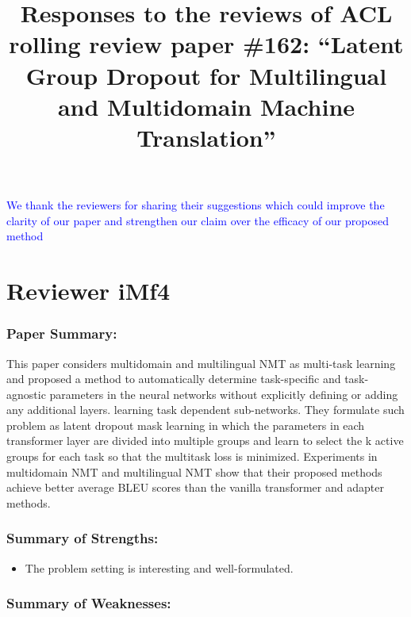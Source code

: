\documentclass[12pt,times,a4paper,twoside]{article}
\title{Responses to the reviews of ACL rolling review paper \#162:
  ``Latent Group Dropout for Multilingual and Multidomain Machine Translation''
}
\date{}
\theoremstyle{definition}
\begin{document}
\maketitle

\textcolor{blue}{We thank the reviewers for sharing their suggestions which could improve the clarity of our paper and strengthen our claim over the efficacy of our proposed method}

\section*{Reviewer iMf4}
\subsubsection*{Paper Summary:}

This paper considers multidomain and multilingual NMT as multi-task learning and proposed a method to automatically determine task-specific and task-agnostic parameters in the neural networks without explicitly defining or adding any additional layers. learning task dependent sub-networks. They formulate such problem as latent dropout mask learning in which the parameters in each transformer layer are divided into multiple groups and learn to select the k active groups for each task so that the multitask loss is minimized. Experiments in multidomain NMT and multilingual NMT show that their proposed methods achieve better average BLEU scores than the vanilla transformer and adapter methods.

\subsubsection*{Summary of Strengths:}

\begin{itemize}
\item The problem setting is interesting and well-formulated.
\end{itemize}

\subsubsection*{Summary of Weaknesses:}
\end{document}
